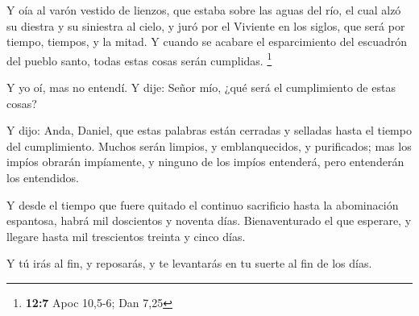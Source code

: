  Y oía al varón vestido de lienzos, que estaba sobre las
aguas del río, el cual alzó su diestra y su siniestra al cielo, y juró
por el Viviente en los siglos, que será por tiempo, tiempos, y la mitad.
Y cuando se acabare el esparcimiento del escuadrón del pueblo santo,
todas estas cosas serán cumplidas. \footnote{\textbf{12:7} Apoc 10,5-6;
  Dan 7,25}

 Y yo oí, mas no entendí. Y dije: Señor mío, ¿qué será el
cumplimiento de estas cosas?

 Y dijo: Anda, Daniel, que estas palabras están cerradas y
selladas hasta el tiempo del cumplimiento.  Muchos serán
limpios, y emblanquecidos, y purificados; mas los impíos obrarán
impíamente, y ninguno de los impíos entenderá, pero entenderán los
entendidos.

 Y desde el tiempo que fuere quitado el continuo
sacrificio hasta la abominación espantosa, habrá mil doscientos y
noventa días.  Bienaventurado el que esperare, y llegare
hasta mil trescientos treinta y cinco días.

 Y tú irás al fin, y reposarás, y te levantarás en tu
suerte al fin de los días.
